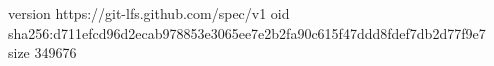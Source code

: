 version https://git-lfs.github.com/spec/v1
oid sha256:d711efcd96d2ecab978853e3065ee7e2b2fa90c615f47ddd8fdef7db2d77f9e7
size 349676
